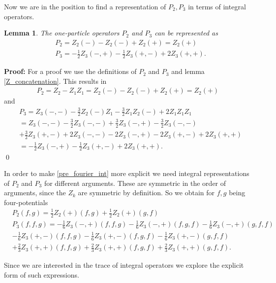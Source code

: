 \documentclass[oneside,reqno,12pt]{amsart}
\newtheorem{Lemma}[Def]{Lemma}
\begin{document}
Now we are in the position to find a representation of \(P_2,P_3\) in terms of integral operators. 
\begin{Lemma}
The one-particle operators \(P_2\) and \(P_3\) can be represented as
\begin{align*}
&P_2=Z_2(-)-Z_2(-)+Z_2(+)=Z_2(+)\\
&P_3=-\frac{1}{2}Z_3(-,+)-\frac{1}{2}Z_3(+,-)+2 Z_3(+,+).
\end{align*}
\end{Lemma}
{\bf Proof:} For a proof we use the definitions of \(P_2\) and \(P_3\) and lemma \ref{Z_concatenation}. This results in 
\begin{align}
P_2=Z_2-Z_1Z_1=Z_2(-)-Z_2(-)+Z_2(+)=Z_2(+)
\end{align} and
\begin{align}\tag*{}
&P_3=Z_3(-,-)-\frac{3}{2}Z_2(-)Z_1-\frac{3}{2}Z_1Z_2(-)+2 Z_1Z_1Z_1\\\tag*{}
 &=Z_3(-,-)-\frac{3}{2}Z_3(-,-)+\frac{3}{2}Z_3(-,+)-\frac{3}{2}Z_3(-,-)\\ \tag*{}
&+\frac{3}{2}Z_3(+,-)+2 Z_3(-,-)-2 Z_3(-,+)-2 Z_3(+,-)+2 Z_3(+,+)\\
&=-\frac{1}{2}Z_3(-,+)-\frac{1}{2}Z_3(+,-)+2 Z_3(+,+)
.\end{align}
\qed

In order to make \eqref{pre_fourier_int} more explicit we need integral representations of \(P_2\) and \(P_3\) for different arguments. These are symmetric in the order of arguments, since the \(Z_k\) are symmetric by definition. 
So we obtain for \(f,g\) being four-potentials
\begin{align}\label{P2int}
&P_2(f,g)=\frac{1}{2}Z_2(+)(f,g)+\frac{1}{2}Z_2(+)(g,f)\\\label{P3int}
&P_3(f,f,g)=
-\frac{1}{6}Z_3(-,+)(f,f,g)-\frac{1}{6}Z_3(-,+)(f,g,f)-\frac{1}{6}Z_3(-,+)(g,f,f)\\\tag*{}
&-\frac{1}{6}Z_3(+,-)(f,f,g)-\frac{1}{6}Z_3(+,-)(f,g,f)-\frac{1}{6}Z_3(+,-)(g,f,f)\\\tag*{}
&+\frac{2}{3} Z_3(+,+)(f,f,g)+\frac{2}{3} Z_3(+,+)(f,g,f)+\frac{2}{3} Z_3(+,+)(g,f,f)
.\end{align}

Since we are interested in the trace of integral operators we explore the explicit form of such expressions.
\end{document}
